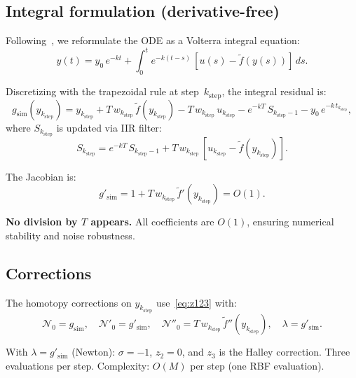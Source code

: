 \documentclass[11pt,a4paper]{article}
\begin{document}
\subsection{Integral formulation (derivative-free)}

Following~\cite{Rodrigo2026integral}, we reformulate the ODE as a Volterra integral equation:
\begin{equation}
y(t) = y_0\,e^{-kt} + \int_0^t e^{-k(t-s)}\,[u(s) - \tilde{f}(y(s))]\,ds.
\label{eq:volterra-rbf}
\end{equation}

Discretizing with the trapezoidal rule at step~$k_{\mathrm{step}}$, the integral residual is:
\begin{equation}
g_{\mathrm{sim}}(y_{k_{\mathrm{step}}}) = y_{k_{\mathrm{step}}} + T\,w_{k_{\mathrm{step}}}\,\tilde{f}(y_{k_{\mathrm{step}}}) - T\,w_{k_{\mathrm{step}}}\,u_{k_{\mathrm{step}}} - e^{-kT}\,S_{k_{\mathrm{step}}-1} - y_0\,e^{-k\,t_{k_{\mathrm{step}}}},
\label{eq:g-sim}
\end{equation}
where $S_{k_{\mathrm{step}}}$ is updated via IIR filter:
\begin{equation}
S_{k_{\mathrm{step}}} = e^{-kT}\,S_{k_{\mathrm{step}}-1} + T\,w_{k_{\mathrm{step}}}\,[u_{k_{\mathrm{step}}} - \tilde{f}(y_{k_{\mathrm{step}}})].
\label{eq:iir-sim}
\end{equation}

The Jacobian is:
\begin{equation}
g'_{\mathrm{sim}} = 1 + T\,w_{k_{\mathrm{step}}}\,\tilde{f}'(y_{k_{\mathrm{step}}}) = O(1).
\label{eq:jac-sim}
\end{equation}

\textbf{No division by $T$ appears.} All coefficients are $O(1)$, ensuring numerical stability and noise robustness.

\subsection{Corrections}

The homotopy corrections on $y_{k_{\mathrm{step}}}$ use~\eqref{eq:z123} with:
\begin{equation}
\mathcal{N}_0 = g_{\mathrm{sim}}, \quad \mathcal{N}'_0 = g'_{\mathrm{sim}}, \quad \mathcal{N}''_0 = T\,w_{k_{\mathrm{step}}}\,\tilde{f}''(y_{k_{\mathrm{step}}}), \quad \lambda = g'_{\mathrm{sim}}.
\end{equation}

With $\lambda = g'_{\mathrm{sim}}$ (Newton): $\sigma = -1$, $z_2 = 0$, and $z_3$ is the Halley correction. Three evaluations per step. Complexity: $O(M)$ per step (one RBF evaluation).
\end{document}
